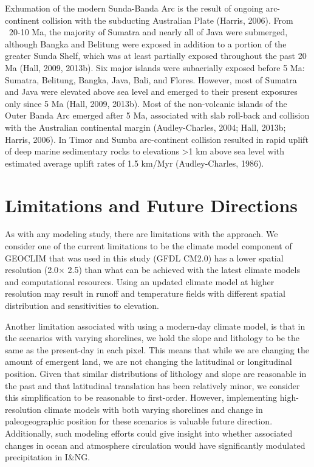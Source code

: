 \documentclass[11pt,letterpaper]{article}
\newcommand{\degrees}{\textdegree\xspace}
\begin{document}
Exhumation of the modern Sunda-Banda Arc is the result of ongoing arc-continent collision with the subducting Australian Plate (Harris, 2006). From ~20-10 Ma, the majority of Sumatra and nearly all of Java were submerged, although Bangka and Belitung were exposed in addition to a portion of the greater Sunda Shelf, which was at least partially exposed throughout the past 20 Ma (Hall, 2009, 2013b). Six major islands were subaerially exposed before 5 Ma: Sumatra, Belitung, Bangka, Java, Bali, and Flores. However, most of Sumatra and Java were elevated above sea level and emerged to their present exposures only since 5 Ma (Hall, 2009, 2013b). Most of the non-volcanic islands of the Outer Banda Arc emerged after 5 Ma, associated with slab roll-back and collision with the Australian continental margin (Audley-Charles, 2004; Hall, 2013b; Harris, 2006). In Timor and Sumba arc-continent collision resulted in rapid uplift of deep marine sedimentary rocks to elevations >1 km above sea level with estimated average uplift rates of 1.5 km/Myr (Audley-Charles, 1986).

\section*{Limitations and Future Directions}

As with any modeling study, there are limitations with the approach. We consider one of the current limitations to be the climate model component of GEOCLIM that was used in this study (GFDL CM2.0) has a lower spatial resolution (2.0\degrees $\times$ 2.5\degrees) than what can be achieved with the latest climate models and computational resources. Using an updated climate model at higher resolution may result in runoff and temperature fields with different spatial distribution and sensitivities to elevation. 

Another limitation associated with using a modern-day climate model, is that in the scenarios with varying shorelines, we hold the slope and lithology to be the same as the present-day in each pixel. This means that while we are changing the amount of emergent land, we are not changing the latitudinal or longitudinal position. Given that similar distributions of lithology and slope are reasonable in the past and that latitudinal translation has been relatively minor, we consider this simplification to be reasonable to first-order. However, implementing high-resolution climate models with both varying shorelines and change in paleogeographic position for these scenarios is valuable future direction. Additionally, such modeling efforts could give insight into whether associated changes in ocean and atmosphere circulation would have significantly modulated precipitation in I\&NG.  
\end{document}
